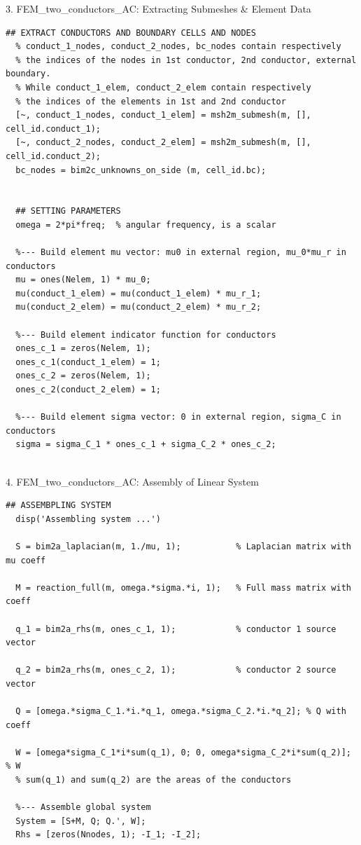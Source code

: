 \documentclass[aspectratio=54,xcolor=dvipsnames]{beamer}
\begin{document}
\begin{frame}[fragile]{3. FEM\_two\_conductors\_AC: Extracting Submeshes \& Element Data}
\scriptsize
\begin{lstlisting}[firstnumber=51]
  ## EXTRACT CONDUCTORS AND BOUNDARY CELLS AND NODES
  % conduct_1_nodes, conduct_2_nodes, bc_nodes contain respectively
  % the indices of the nodes in 1st conductor, 2nd conductor, external boundary.
  % While conduct_1_elem, conduct_2_elem contain respectively
  % the indices of the elements in 1st and 2nd conductor
  [~, conduct_1_nodes, conduct_1_elem] = msh2m_submesh(m, [], cell_id.conduct_1);
  [~, conduct_2_nodes, conduct_2_elem] = msh2m_submesh(m, [], cell_id.conduct_2);
  bc_nodes = bim2c_unknowns_on_side (m, cell_id.bc);


  ## SETTING PARAMETERS
  omega = 2*pi*freq;  % angular frequency, is a scalar

  %--- Build element mu vector: mu0 in external region, mu_0*mu_r in conductors
  mu = ones(Nelem, 1) * mu_0;
  mu(conduct_1_elem) = mu(conduct_1_elem) * mu_r_1;
  mu(conduct_2_elem) = mu(conduct_2_elem) * mu_r_2;

  %--- Build element indicator function for conductors
  ones_c_1 = zeros(Nelem, 1);
  ones_c_1(conduct_1_elem) = 1;
  ones_c_2 = zeros(Nelem, 1);
  ones_c_2(conduct_2_elem) = 1;

  %--- Build element sigma vector: 0 in external region, sigma_C in conductors
  sigma = sigma_C_1 * ones_c_1 + sigma_C_2 * ones_c_2;
  
\end{lstlisting}
\end{frame}

\begin{frame}[fragile]{4. FEM\_two\_conductors\_AC: Assembly of Linear System}
\scriptsize
\begin{lstlisting}[firstnumber=79]
  ## ASSEMBPLING SYSTEM
  disp('Assembling system ...')

  S = bim2a_laplacian(m, 1./mu, 1);           % Laplacian matrix with mu coeff

  M = reaction_full(m, omega.*sigma.*i, 1);   % Full mass matrix with coeff

  q_1 = bim2a_rhs(m, ones_c_1, 1);            % conductor 1 source vector

  q_2 = bim2a_rhs(m, ones_c_2, 1);            % conductor 2 source vector

  Q = [omega.*sigma_C_1.*i.*q_1, omega.*sigma_C_2.*i.*q_2]; % Q with coeff

  W = [omega*sigma_C_1*i*sum(q_1), 0; 0, omega*sigma_C_2*i*sum(q_2)]; % W
  % sum(q_1) and sum(q_2) are the areas of the conductors

  %--- Assemble global system
  System = [S+M, Q; Q.', W];
  Rhs = [zeros(Nnodes, 1); -I_1; -I_2];
  
\end{lstlisting}
\end{frame}
\end{document}
